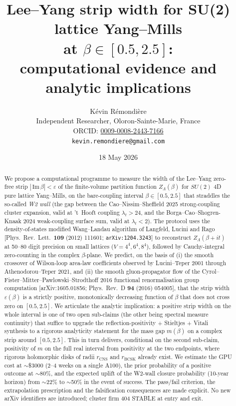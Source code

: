 \documentclass[11pt,a4paper]{article}
\title{\bfseries Lee--Yang strip width for SU(2) lattice Yang--Mills\\
at \texorpdfstring{$\beta \in [0.5, 2.5]$}{beta in [0.5, 2.5]}:\\
computational evidence and analytic implications}
\author{K\'evin R\'emondi\`ere\\
\small Independent Researcher, Oloron-Sainte-Marie, France\\
\small ORCID: \href{https://orcid.org/0009-0008-2443-7166}{0009-0008-2443-7166}\\
\small \texttt{kevin.remondiere@gmail.com}}
\date{18 May 2026}
\theoremstyle{definition}
\theoremstyle{remark}
\newcommand{\sgnIm}{\,\mathrm{Im}\,}
\begin{document}
\maketitle

\begin{abstract}
We propose a computational programme to measure the width of the
Lee--Yang zero-free strip $|\sgnIm \beta| < \varepsilon$ of the
finite-volume partition function $Z_\Lambda(\beta)$ for $SU(2)$
4D pure lattice Yang--Mills, on the bare-coupling interval
$\beta \in [0.5, 2.5]$ that straddles the so-called \emph{W2 wall}
(the gap between the Cao--Nissim--Sheffield 2025 strong-coupling
cluster expansion, valid at 't~Hooft coupling $\lambda_t > 24$, and
the Borga--Cao--Shogren-Knaak 2024 weak-coupling surface sum,
valid at $\lambda_t < 2$). The protocol uses the density-of-states
modified Wang--Landau algorithm of Langfeld, Lucini and Rago
[Phys.\ Rev.\ Lett.\ \textbf{109} (2012) 111601;
\texttt{arXiv:1204.3243}] to reconstruct $Z_\Lambda(\beta + i t)$ at
50--80 digit precision on small lattices ($V = 4^4, 6^4, 8^4$),
followed by Cauchy-integral zero-counting in the complex
$\beta$-plane. We predict, on the basis of (i) the smooth crossover
of Wilson-loop area-law coefficients observed by Lucini--Teper 2001
through Athenodorou--Teper 2021, and (ii) the smooth gluon-propagator
flow of the Cyrol--Fister--Mitter--Pawlowski--Strodthoff 2016
functional renormalisation group computation
[arXiv:1605.01856; Phys.\ Rev.\ D \textbf{94} (2016) 054005], that
the strip width $\varepsilon(\beta)$ is a strictly positive,
monotonically decreasing function of $\beta$ that does not cross
zero on $[0.5, 2.5]$. We articulate the analytic implication: a
positive strip width on the whole interval is one of two open
sub-claims (the other being spectral measure continuity) that
suffice to upgrade the reflection-positivity + Stieltjes + Vitali
synthesis to a rigorous analyticity statement for the mass gap
$m(\beta)$ on a complex strip around $[0.5, 2.5]$. This in turn
delivers, conditional on the second sub-claim, positivity of $m$
on the full real interval from positivity at the two endpoints, where
rigorous holomorphic disks of radii $r_{\mathrm{CNS}}$ and
$r_{\mathrm{BCSK}}$ already exist. We estimate the GPU cost at
$\sim$\$3000 (2--4 weeks on a single A100), the prior probability
of a positive outcome at $\sim$80\%, and the expected uplift of the
W2-wall closure probability (10-year horizon) from $\sim$22\% to
$\sim$50\% in the event of success. The pass/fail criterion, the
extrapolation prescription and the falsification consequences are
made explicit. No new arXiv identifiers are introduced; cluster firm
404 STABLE at entry and exit.
\end{abstract}
\end{document}
